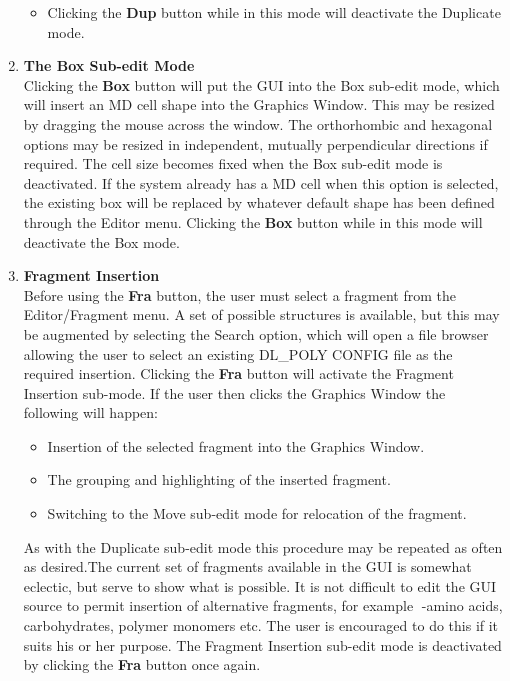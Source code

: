 \begin{enumerate}
\begin{itemize}
\item Clicking the {\bf Dup} button while in this mode will deactivate the
  Duplicate mode.
\end{itemize}
\item {\bf The Box Sub-edit Mode }\\
  Clicking the {\bf Box} button will put the GUI into the Box sub-edit mode,
  which will insert an MD cell shape into the Graphics Window. This may be
  resized by dragging the mouse across the window. The orthorhombic and
  hexagonal options may be resized in independent, mutually perpendicular
  directions if required. The cell size becomes fixed when the Box sub-edit
  mode is deactivated. If the system already has a MD cell when this option is
  selected, the existing box will be replaced by whatever default shape has
  been defined through the Editor menu.  Clicking the {\bf Box} button while
  in this mode will deactivate the Box mode.
\item {\bf Fragment Insertion }\\
  Before using the {\bf Fra} button, the user must select a fragment from the
  Editor/Fragment menu. A set of possible structures is available, but this
  may be augmented by selecting the Search option, which will open a file
  browser allowing the user to select an existing DL\_POLY CONFIG file as the
  required insertion. Clicking the {\bf Fra} button will activate the Fragment
  Insertion sub-mode. If the user then clicks the Graphics Window the
  following will happen:
\begin{itemize}
\item Insertion of the selected fragment into the Graphics Window.  
\item The grouping and highlighting of the inserted fragment.  
\item Switching to the Move sub-edit mode for relocation of the fragment.
\end{itemize}
As with the Duplicate sub-edit mode this procedure may be repeated as often as
desired.The current set of fragments available in the GUI is somewhat
eclectic, but serve to show what is possible. It is not difficult to edit the
GUI source to permit insertion of alternative fragments, for example -amino
acids, carbohydrates, polymer monomers etc. The user is encouraged to do this
if it suits his or her purpose. The Fragment Insertion sub-edit mode is
deactivated by clicking the {\bf Fra} button once again.
\end{enumerate}
